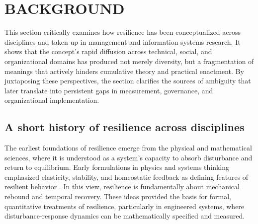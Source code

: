 \section{\MakeUppercase {Background}}
\label{sec:Background}

This section critically examines how resilience has been conceptualized across disciplines and taken up in management and information systems research. It shows that the concept’s rapid diffusion across technical, social, and organizational domains has produced not merely diversity, but a fragmentation of meanings that actively hinders cumulative theory and practical enactment. By juxtaposing these perspectives, the section clarifies the sources of ambiguity that later translate into persistent gaps in measurement, governance, and organizational implementation.

\subsection{A short history of resilience across disciplines}


The earliest foundations of resilience emerge from the physical and mathematical sciences, where it is understood as a system’s capacity to absorb disturbance and return to equilibrium. Early formulations in physics and systems thinking emphasized elasticity, stability, and homeostatic feedback as defining features of resilient behavior \autocite{rankine1858manual, wiener1948cybernetics, panteli2017metrics}. In this view, resilience is fundamentally about mechanical rebound and temporal recovery. These ideas provided the basis for formal, quantitative treatments of resilience, particularly in engineered systems, where disturbance-response dynamics can be mathematically specified and measured.\\

